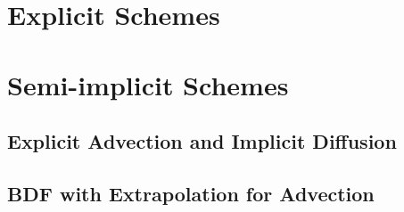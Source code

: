 \section{Explicit Schemes}

\section{Semi-implicit Schemes}

\subsection{Explicit Advection and Implicit Diffusion}

\subsection{BDF with Extrapolation for Advection}
